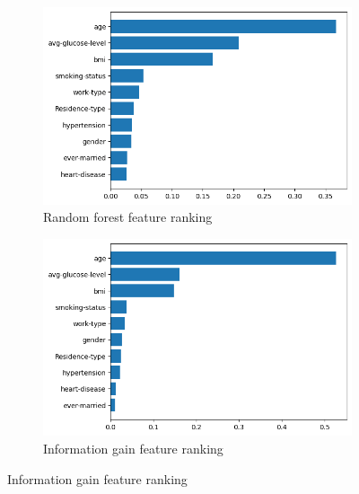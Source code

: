 \documentclass[twocolumn, 9pt]{extarticle}
\begin{document}
\begin{figure}[ht]
\centering
    \begin{subfigure}[b]{\linewidth}
    \includegraphics[scale=0.4]{images/feature_ranking_random_forest.png}
    \caption{Random forest feature ranking}
    \label{fig:feature_ranking_forest}
    \end{subfigure}
    
    \begin{subfigure}[b]{\linewidth}
    \includegraphics[scale=0.4]{images/feature_ranking_info_gain.png}
    \caption{Information gain feature ranking}
    \label{fig:feature_ranking_information}
    \end{subfigure}
    

\end{figure}
\end{document}
